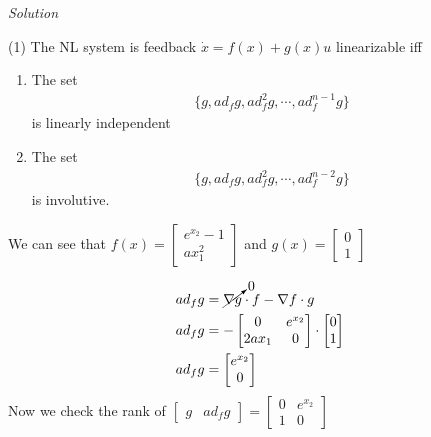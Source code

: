 \documentclass{article}
\begin{document}
  \textit{Solution} \newline \newline
  
  (1) The NL system is feedback $\dot{x}=f(x)+g(x)u$ linearizable iff
  \begin{enumerate}[label=(\alph*)]
    \item The set
      \begin{align*}
        \{g, ad_fg, ad_f^2g, \cdots, ad_f^{n-1}g\}
      \end{align*}
      is linearly independent
    \item The set
      \begin{align*}
        \{g, ad_fg, ad_f^2g, \cdots, ad_f^{n-2}g\}
      \end{align*}
      is involutive.
  \end{enumerate}

  We can see that $f(x)=\begin{bmatrix}
                          e^{x_2}-1 \\
                          ax_1^2
                        \end{bmatrix}$ and $g(x)=\begin{bmatrix}
                                                    0 \\
                                                    1
                                                  \end{bmatrix}$
                                                  
  \begin{align*}
    ad_fg &= \cancelto{0}{\nabla g} \cdot f - \nabla f \cdot g \\
    ad_fg &= -\begin{bmatrix}
                0 & e^{x_2} \\
                2ax_1 & 0
              \end{bmatrix} \cdot
              \begin{bmatrix}
                0 \\
                1
              \end{bmatrix} \\
    ad_fg &= \begin{bmatrix}
                e^{x_2} \\
                0
              \end{bmatrix}
  \end{align*}
  Now we check the rank of $\begin{bmatrix}
    g & ad_fg
  \end{bmatrix} =
  \begin{bmatrix}
    0 & e^{x_2} \\
    1 & 0
  \end{bmatrix}$
\end{document}
